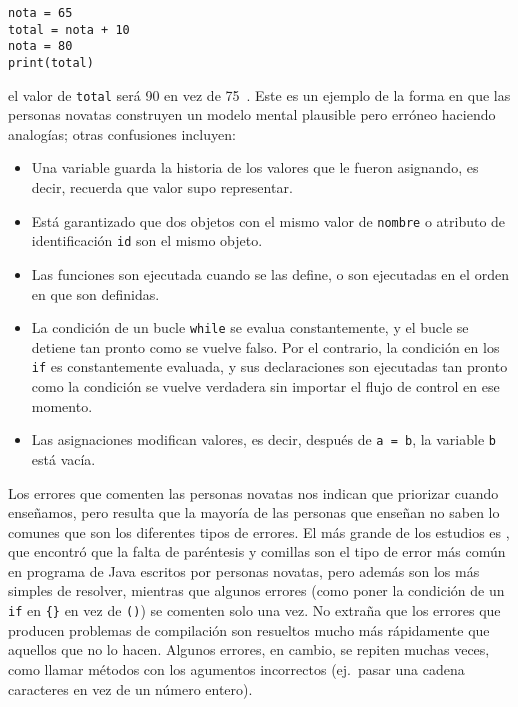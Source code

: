 \begin{verbatim}
nota = 65
total = nota + 10
nota = 80
print(total)
\end{verbatim}

\noindent
el valor de \texttt{total} será 90 en vez de 75~\cite{Kohn2017}.
Este es un ejemplo de la forma en que las personas novatas construyen un modelo 
mental plausible pero erróneo haciendo analogías; otras confusiones incluyen:


\begin{itemize}

\item
  Una variable guarda la historia de los valores que le fueron asignando,
  es decir, recuerda que valor supo representar.

\item
  Está garantizado que dos objetos con el mismo valor de \texttt{nombre} 
  o atributo de identificación \texttt{id} son el mismo objeto.   
  

\item
  Las funciones son ejecutada cuando se las define,
  o son ejecutadas en el orden en que son definidas.

\item
  La condición de un bucle \texttt{while} se evalua constantemente,
  y el bucle se detiene tan pronto como se vuelve falso.
  Por el contrario,
  la condición en los \texttt{if} es constantemente evaluada,
  y sus declaraciones son ejecutadas tan pronto como la condición se vuelve verdadera
  sin importar el flujo de control en ese momento.

\item
  Las asignaciones modifican valores,
  es decir, después de \texttt{a\ =\ b}, la variable \texttt{b} está vacía.

\end{itemize}


Los errores que comenten las personas novatas nos indican que priorizar cuando enseñamos,
pero resulta que la mayoría de las personas que enseñan no saben lo comunes que son los diferentes tipos de errores.
El más grande de los estudios es \cite{Brow2017},
que encontró que la falta de paréntesis y comillas son el tipo de error más común en programa de Java escritos por personas novatas,
pero además son los más simples de resolver,
mientras que algunos errores (como poner la condición de un \texttt{if} en \texttt{\{\}} en vez de \texttt{()})
se comenten solo una vez.
No extraña que los errores que producen problemas de compilación son resueltos mucho más rápidamente
que aquellos que no lo hacen.
Algunos errores, en cambio, se repiten muchas veces, como llamar métodos con los agumentos incorrectos
(ej.\ pasar una cadena caracteres en vez de un número entero).

